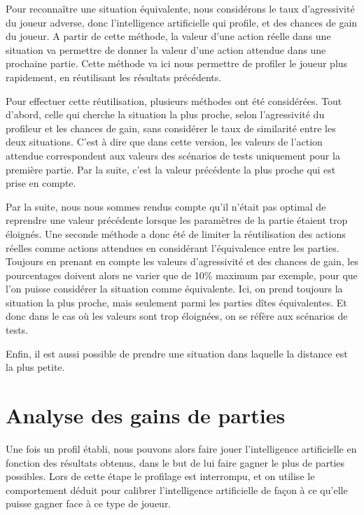 \documentclass{report}
\begin{document}
Pour reconnaître une situation équivalente, nous considérons le taux d'agressivité du joueur adverse, donc l'intelligence artificielle qui profile, et des chances de gain du joueur. A partir de cette méthode, la valeur d'une action réelle dans une situation va permettre de donner la valeur d'une action attendue dans une prochaine partie. Cette méthode va ici nous permettre de profiler le joueur plus rapidement, en réutilisant les résultats précédents.\par

Pour effectuer cette réutilisation, plusieurs méthodes ont été considérées. Tout d'abord, celle qui cherche la situation la plus proche, selon l'agressivité du profileur et les chances de gain, sans considérer le taux de similarité entre les deux situations. C'est à dire que dans cette version, les valeurs de l'action attendue correspondent aux valeurs des scénarios de tests uniquement pour la première partie. Par la suite, c'est la valeur précédente la plus proche qui est prise en compte.\par

Par la suite, nous nous sommes rendus compte qu'il n'était pas optimal de reprendre une valeur précédente lorsque les paramètres de la partie étaient trop éloignés. Une seconde méthode a donc été de limiter la réutilisation des actions réelles comme actions attendues en considérant l'équivalence entre les parties. Toujours en prenant en compte les valeurs d'agressivité et des chances de gain, les pourcentages doivent alors ne varier que de 10\% maximum par exemple, pour que l'on puisse considérer la situation comme équivalente. Ici, on prend toujours la situation la plus proche, mais seulement parmi les parties dîtes équivalentes. Et donc dans le cas où les valeurs sont trop éloignées, on se réfère aux scénarios de tests.\par
Enfin, il est aussi possible de prendre une situation dans laquelle la distance est la plus petite.




\chapter{Analyse des gains de parties}

\hspace{0.5cm}Une fois un profil établi, nous pouvons alors faire jouer l'intelligence artificielle en fonction des résultats obtenus, dans le but de lui faire gagner le plus de parties possibles. Lors de cette étape le profilage est interrompu, et on utilise le comportement déduit pour calibrer l'intelligence artificielle de façon à ce qu'elle puisse gagner face à ce type de joueur.\par
\end{document}
